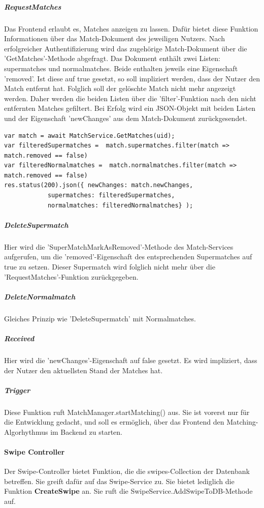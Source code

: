 \noindent
\subparagraph{RequestMatches} 
Das Frontend erlaubt es, Matches anzeigen zu lassen. Dafür bietet diese Funktion Informationen über das Match-Dokument des jeweiligen Nutzers. Nach erfolgreicher Authentifizierung wird das zugehörige Match-Dokument über die 'GetMatches'-Methode abgefragt. Das Dokument enthält zwei Listen: supermatches und normalmatches. Beide enthalten jeweils eine Eigenschaft 'removed'. Ist diese auf true gesetzt, so soll impliziert werden, dass der Nutzer den Match entfernt hat. Folglich soll der gelöschte Match nicht mehr angezeigt werden. Daher werden die beiden Listen über die 'filter'-Funktion nach den nicht entfernten Matches gefiltert. Bei Erfolg wird ein JSON-Objekt mit beiden Listen und der Eigenschaft 'newChanges' aus dem Match-Dokument zurückgesendet.
 
\begin{lstlisting}[caption=MatchController - RequestMatches, label=lst:matchcontrollerrequestmatches]
var match = await MatchService.GetMatches(uid);
var filteredSupermatches =  match.supermatches.filter(match => match.removed == false)
var filteredNormalmatches =  match.normalmatches.filter(match => match.removed == false)
res.status(200).json({ newChanges: match.newChanges,
            supermatches: filteredSupermatches, 
            normalmatches: filteredNormalmatches} );
\end{lstlisting}

\noindent
\subparagraph{DeleteSupermatch} 
Hier wird die 'SuperMatchMarkAsRemoved'-Methode des Match-Services aufgerufen, um die 'removed'-Eigenschaft des entsprechenden Supermatches auf true zu setzen. Dieser Supermatch wird folglich nicht mehr über die 'RequestMatches'-Funktion zurückgegeben.

\noindent
\subparagraph{DeleteNormalmatch} 
Gleiches Prinzip wie 'DeleteSupermatch' mit Normalmatches.

\noindent
\subparagraph{Received} 
Hier wird die 'newChanges'-Eigenschaft auf false gesetzt. Es wird impliziert, dass der Nutzer den aktuellsten Stand der Matches hat.

\noindent
\subparagraph{Trigger} 
Diese Funktion ruft MatchManager.startMatching() aus. Sie ist vorerst nur für die Entwicklung gedacht, und soll es ermöglich, über das Frontend den Matching-Algorhythmus im Backend zu starten.

%
%


\paragraph{Swipe Controller}
Der Swipe-Controller bietet Funktion, die die swipes-Collection der Datenbank betreffen. Sie greift dafür auf das Swipe-Service zu.
Sie bietet lediglich die Funktion \textbf{CreateSwipe} an. Sie ruft die SwipeService.AddSwipeToDB-Methode auf.